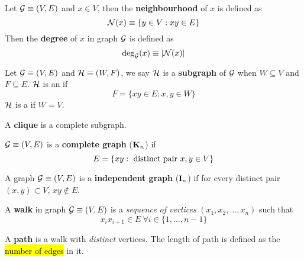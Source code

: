 \documentclass{article}
\begin{document}
		\begin{definition}
			Let $\mathcal{{G}} \equiv (V, E)$ and $x \in V$, then the \textbf{neighbourhood} of $x$ is defined as
			\begin{equation}
				\mathcal{{N}}(x) \equiv \{y \in V: xy \in E\}
			\end{equation}
			Then the \textbf{degree} of $x$ in graph $\mathcal{{G}}$ is defined as
			\begin{equation}
				\text{{deg}}_{\mathcal{{G}}}(x) \equiv |\mathcal{{N}}(x)|
			\end{equation}
		\end{definition}
		
		\begin{definition}
			Let $\mathcal{{G}} \equiv (V, E)$ and $\mathcal{{H}} \equiv (W, F)$, we say $\mathcal{{H}}$ is a \textbf{subgraph} of $\mathcal{{G}}$ when $W \subseteq V$ and $F \subseteq E$. $\mathcal{{H}}$ is an  if
			\begin{equation}
				F = \{xy \in E: x, y \in W\}	
			\end{equation}
			$\mathcal{{H}}$ is a  if $W = V$.
		\end{definition}
		
		\begin{definition}
			A \textbf{clique} is a complete subgraph.
		\end{definition}
		
		\begin{definition}
			$\mathcal{{G}} \equiv (V, E)$ is a \textbf{complete graph} ($\textbf{K}_n$) if 
			\begin{equation}
				E = \{xy: \text{{ distinct pair }} x, y \in V\}
			\end{equation}
		\end{definition}
		
		\begin{definition}
			A graph $\mathcal{{G}} \equiv (V, E)$ is a \textbf{independent graph} ($\textbf{I}_n$) if for every distinct pair $(x, y) \subset V$, $xy \notin E$.
		\end{definition}
		
		\begin{definition}
			A \textbf{walk} in graph $\mathcal{{G}} \equiv (V, E)$ is a \emph{sequence of vertices} $(x_1, x_2, \dots, x_n)$ such that 
			\begin{equation}
				x_ix_{i+1} \in E\  \forall i \in \{1,\dots,n-1\}
			\end{equation}
		\end{definition}
		
		\begin{definition}
			A \textbf{path} is a walk with \emph{distinct} vertices. The length of path is defined as the \hl{number of edges} in it.
		\end{definition}
		
\end{document}
